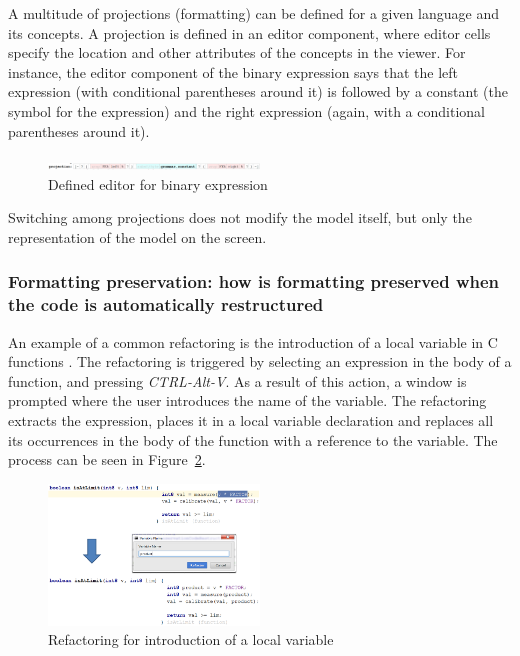 \documentclass[preprint,numbers,10pt]{sigplanconf}
\begin{document}
A multitude of projections (formatting) can be defined for a given language and its concepts.
A projection is defined in an editor component, where editor cells specify the location and other attributes
of the concepts in the viewer. For instance, the editor component of the binary expression
says that the left expression (with conditional parentheses around it) is followed by a constant (the
symbol for the expression) and the right expression (again, with a conditional parentheses around it).

\begin{figure}[H]
	\centering
	\includegraphics[width=0.50\textwidth]{screens/EditorMultiExpression.png}
	\caption{Defined editor for binary expression}
	\label{fig:DefaultEditor}
\end{figure}

Switching among projections does not modify the model itself, but only the representation of the model
on the screen.

\subsubsection{Formatting preservation: how is formatting preserved when the code is automatically restructured}
An example of a common refactoring is the introduction of a local variable in C functions \cite{voelter2014generic}.
The refactoring is triggered by selecting an expression in the body of a function, and pressing \emph{CTRL-Alt-V}.
As a result of this action, a window is prompted where the user introduces the name of the variable.
The refactoring extracts the expression, places it in a
local variable declaration and replaces all its occurrences in the body of the function with a reference to the variable.
The process can be seen in Figure~\ref{fig:IntroLocalVar}.

\begin{figure}[H]
	\centering
	\includegraphics[width=0.50\textwidth]{screens/IntroLocalVar.png}
	\caption{Refactoring for introduction of a local variable}
	\label{fig:IntroLocalVar}
\end{figure}
\end{document}
